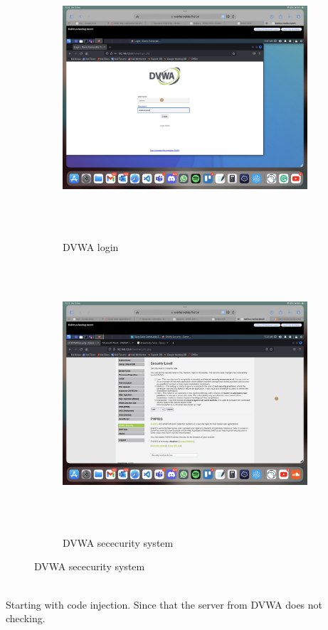 \documentclass[12pt, letterpaper]{article}
\begin{document}
\begin{figure}[!ht]
    \centering
    \begin{subfigure}{.5\textwidth}
        \centering
        \includegraphics[width=1\textwidth]{fotos/Bok week 1/DVWA/DVWA-login.png}
        \caption{DVWA login}
        \label{fig:sub6}
    \end{subfigure}%
    \begin{subfigure}{.5\textwidth}
        \centering
        \includegraphics[width=1\textwidth]{fotos/Bok week 1/DVWA/DVWA-settings-low.png}
        \caption{DVWA sececurity system}
        \label{fig:sub7}
    \end{subfigure}
\end{figure}\mbox{}\\
\hfill \break
Starting with code injection. Since that the server from DVWA does not checking. 
\newpage
\end{document}

